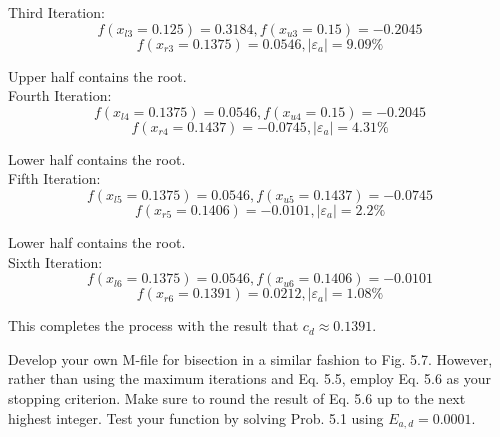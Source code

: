 \documentclass{article}
\begin{document}
Third Iteration:
\[ f(x_{l3}=0.125) = 0.3184, f(x_{u3}=0.15) = -0.2045 \]
\[ f(x_{r3}=0.1375) = 0.0546, \left| \varepsilon_{a} \right| = 9.09\% \]

Upper half contains the root.\\

Fourth Iteration:
\[ f(x_{l4}=0.1375) = 0.0546, f(x_{u4}=0.15) = -0.2045 \]
\[ f(x_{r4}=0.1437) = -0.0745, \left| \varepsilon_{a} \right| = 4.31\% \]

Lower half contains the root.\\

Fifth Iteration:
\[ f(x_{l5}=0.1375) = 0.0546, f(x_{u5}=0.1437) = -0.0745 \]
\[ f(x_{r5}=0.1406) = -0.0101, \left| \varepsilon_{a} \right| = 2.2\% \]

Lower half contains the root.\\

Sixth Iteration:
\[ f(x_{l6}=0.1375) = 0.0546, f(x_{u6}=0.1406) = -0.0101 \]
\[ f(x_{r6}=0.1391) = 0.0212, \left| \varepsilon_{a} \right| = 1.08\% \]

This completes the process with the result that $\boxed{c_{d}\approx 0.1391}$.

\begin{problem}

	Develop your own M-file for bisection in a similar fashion to Fig. 5.7. However, rather than using the maximum iterations and Eq. 5.5, employ Eq. 5.6 as your stopping criterion. Make sure to round the result of Eq. 5.6 up to the next highest integer. Test your function by solving Prob. 5.1 using $E_{a,d}=0.0001$.
	
\end{problem}
\end{document}
